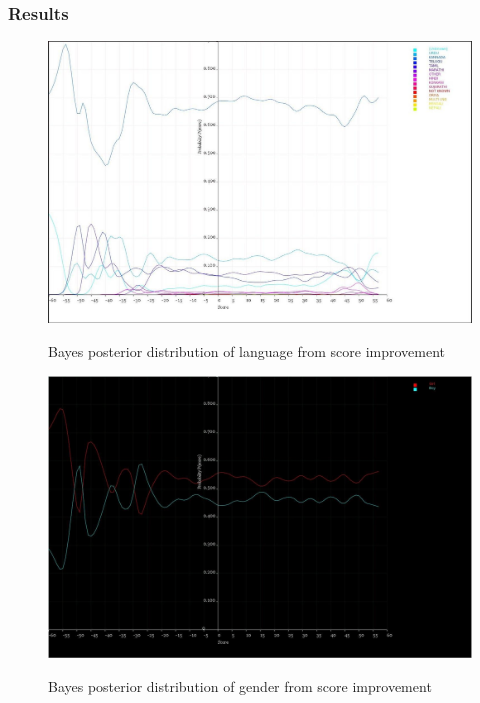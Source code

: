 \documentclass[10pt]{article}
\begin{document}
\subsubsection{Results}
\begin{figure}
\caption{Bayes posterior distribution of language from score improvement}
\label{BayesLanguageFromImprovement}
\begin{center}
\includegraphics[width=160mm]{ReportMedia/BayesLanguageFromImprovement.jpg}\\
\end{center}
\end{figure}
\newpage
\begin{figure}
\caption{Bayes posterior distribution of gender from score improvement}
\label{BayesGenderFromImprovement}
\begin{center}
\includegraphics[width=160mm]{ReportMedia/BayesGenderFromImprovement.jpg}\\
\end{center}
\end{figure}
\end{document}
